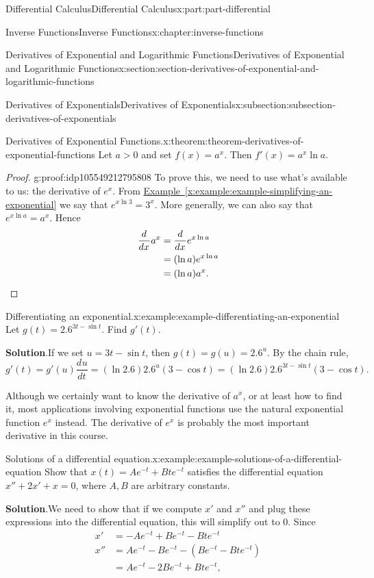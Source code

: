 \documentclass[twoside,10pt,]{book}
\newcommand{\blocktitlefont}{\relax}
\newcommand{\xreffont}{\relax}
\numberwithin{equation}{part}
\newcommand{\qedhere}{\relax}
\newcommand{\dv}[3][]{\dfrac{d^{#1} #2}{d #3^{#1}}}
\begin{document}
\begin{partptx}{Differential Calculus}{}{Differential Calculus}{}{}{x:part:part-differential}
\begin{chapterptx}{Inverse Functions}{}{Inverse Functions}{}{}{x:chapter:inverse-functions}
\begin{sectionptx}{Derivatives of Exponential and Logarithmic Functions}{}{Derivatives of Exponential and Logarithmic Functions}{}{}{x:section:section-derivatives-of-exponential-and-logarithmic-functions}
\begin{subsectionptx}{Derivatives of Exponentials}{}{Derivatives of Exponentials}{}{}{x:subsection:subsection-derivatives-of-exponentials}
\begin{theorem}{Derivatives of Exponential Functions.}{}{x:theorem:theorem-derivatives-of-exponential-functions}
%
Let \(a > 0\) and set \(f(x) = a^{x}\). Then \(f'(x) = a^{x}\ln a\).%
\end{theorem}
\begin{proof}{}{g:proof:idp105549212795808}
To prove this, we need to use what's available to us: the derivative of \(e^{x}\). From \hyperref[x:example:example-simplifying-an-exponential]{Example~{\xreffont\ref{x:example:example-simplifying-an-exponential}}} we say that \(e^{x\ln 3} = 3^{x}\). More generally, we can also say that \(e^{x\ln a} = a^{x}\). Hence%
\begin{align*}
\dv{}{x}a^{x} & = \dv{}{x}e^{x\ln a} \\
& = (\ln a)e^{x\ln a} \\
& = (\ln a)a^{x}. \qedhere
\end{align*}
%
\end{proof}
\begin{example}{Differentiating an exponential.}{x:example:example-differentiating-an-exponential}%
Let \(g(t) = 2.6^{3t - \sin t}\). Find \(g'(t)\).%
\par\smallskip%
\noindent\textbf{\blocktitlefont Solution}.\hypertarget{g:solution:idp105549212800544}{}\quad{}If we set \(u = 3t - \sin t\), then \(g(t) = g(u) = 2.6^{u}\). By the chain rule, \(g'(t) = g'(u)\dv{u}{t} = (\ln2.6)2.6^{u}(3-\cos t) = (\ln2.6)2.6^{3t-\sin t}(3-\cos t).\)%
\end{example}
Although we certainly want to know the derivative of \(a^{x}\), or at least how to find it, most applications involving exponential functions use the natural exponential function \(e^{x}\) instead. The derivative of \(e^{x}\) is probably the most important derivative in this course.%
\begin{example}{Solutions of a differential equation.}{x:example:example-solutions-of-a-differential-equation}%
Show that \(x(t) = Ae^{-t} + Bte^{-t}\) satisfies the differential equation \(x'' + 2x' + x = 0\), where \(A,B\) are arbitrary constants.%
\par\smallskip%
\noindent\textbf{\blocktitlefont Solution}.\hypertarget{g:solution:idp105549212805152}{}\quad{}We need to show that if we compute \(x'\) and \(x''\) and plug these expressions into the differential equation, this will simplify out to \(0\). Since%
\begin{align*}
x' & = -Ae^{-t} +Be^{-t} - Bte^{-t} \\
x'' & = Ae^{-t} - Be^{-t} - (Be^{-t} - Bte^{-t}) \\
& = Ae^{-t} - 2Be^{-t} + Bte^{-t}, 

\end{align*}
\end{example}
\end{subsectionptx}
\end{sectionptx}
\end{chapterptx}
\end{partptx}
\end{document}
